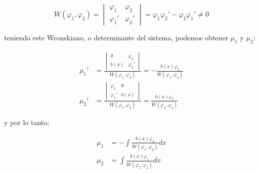 		\begin{equation}
			W(\varphi_1, \varphi_2) =
			\begin{vmatrix}
				\varphi_1 & \varphi_2 \\
				\varphi_1' & \varphi_2'
			\end{vmatrix} = \varphi_1 \varphi_2' - \varphi_2 \varphi_1' \ne 0
		\end{equation}

		teniendo este Wronskiano, o determinante del sistema, podemos obtener $\mu_1$ y $\mu_2$:

		\begin{align*}
			\mu_1' &= \frac{\begin{vmatrix} 0 & \varphi_2 \\ b(x) & \varphi_2' \end{vmatrix}}{W(\varphi_1, \varphi_2)} = -\frac{b(x) \varphi_2}{W(\varphi_1, \varphi_2)} \\
			\mu_2' &= \frac{\begin{vmatrix} \varphi_1 & 0 \\ \varphi_1' & b(x) \end{vmatrix}}{W(\varphi_1, \varphi_2)} = \frac{b(x) \varphi_1}{W(\varphi_1, \varphi_2)}
		\end{align*}

		y por lo tanto:

		\begin{align*}
			\mu_1 &= - \int \frac{b(x) \varphi_2}{W(\varphi_1, \varphi_2)} dx \\
			\mu_2 &= \int \frac{b(x) \varphi_1}{W(\varphi_1, \varphi_2)} dx
		\end{align*}

